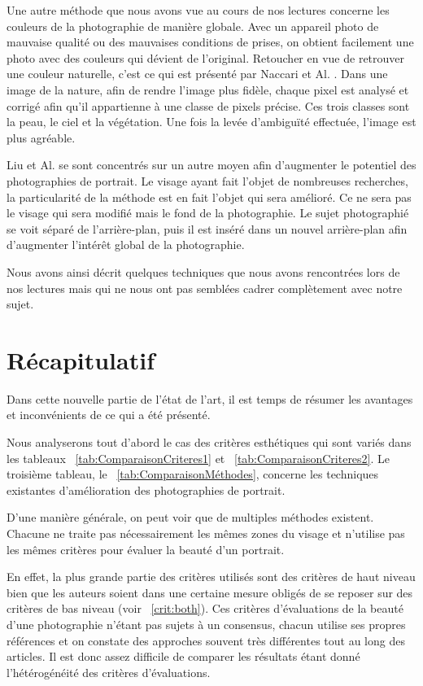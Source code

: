 \documentclass[11pt, french,screen]{report-rd-info}
\begin{document}
Une autre méthode que nous avons vue au cours de nos lectures concerne les couleurs de la photographie de manière globale. Avec un appareil photo de mauvaise qualité ou des mauvaises conditions de prises, on obtient facilement une photo avec des couleurs qui dévient de l’original. Retoucher en vue de retrouver une couleur naturelle, c'est ce qui est présenté par Naccari et Al. \cite{Naccari}. Dans une image de la nature, afin de rendre l’image plus fidèle, chaque pixel est analysé et corrigé afin qu’il appartienne à une classe de pixels précise. Ces trois classes sont la peau, le ciel et la végétation. Une fois la levée d’ambiguïté effectuée, l’image est plus agréable.

Liu et Al. \cite{Liu2007} se sont concentrés sur un autre moyen afin d’augmenter le potentiel des photographies de portrait. Le visage ayant fait l’objet de nombreuses recherches, la particularité de la méthode est en fait l’objet qui sera amélioré. Ce ne sera pas le visage qui sera modifié mais le fond de la photographie. Le sujet photographié se voit séparé de l’arrière-plan, puis il est inséré dans un nouvel arrière-plan afin d’augmenter l’intérêt global de la photographie.

Nous avons ainsi décrit quelques techniques que nous avons rencontrées lors de nos lectures mais qui ne nous ont pas semblées cadrer complètement avec notre sujet.
\section{Récapitulatif}
Dans cette nouvelle partie de l'état de l'art, il est temps de résumer les avantages et inconvénients de ce qui a été présenté.

Nous analyserons tout d'abord le cas des critères esthétiques
qui sont variés dans les tableaux ~\ref{tab:ComparaisonCriteres1} et ~\ref{tab:ComparaisonCriteres2}. Le troisième tableau, le ~\ref{tab:ComparaisonMéthodes},
concerne les techniques existantes d'amélioration des photographies de portrait.

D’une manière générale, on peut voir que de multiples méthodes existent. Chacune ne traite pas nécessairement les mêmes zones du visage et n’utilise pas les mêmes critères pour évaluer la beauté d’un portrait.

En effet, la plus grande partie des critères utilisés sont des critères de haut niveau bien que les auteurs soient dans une certaine mesure obligés de se reposer sur des critères de bas niveau (voir ~\ref{crit:both}). Ces critères d’évaluations de la beauté d’une photographie n’étant pas sujets à un consensus, chacun utilise ses propres références et on constate des approches souvent très différentes tout au long des articles. Il est donc assez difficile de comparer les résultats étant donné l’hétérogénéité des critères d’évaluations.
\end{document}

